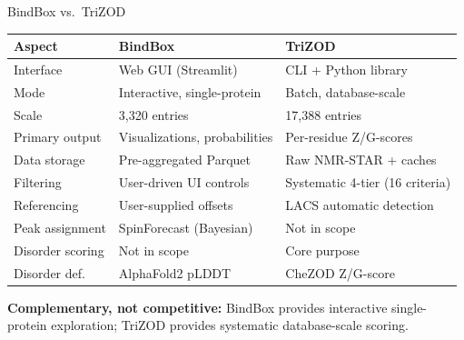 \documentclass[aspectratio=169,11pt]{beamer}
\begin{document}
\begin{frame}[shrink=5]{BindBox vs.\ TriZOD}

\begin{center}
\footnotesize
\begin{tabular}{lll}
\toprule
\textbf{Aspect} & \textbf{BindBox} & \textbf{TriZOD} \\
\midrule
Interface    & Web GUI (Streamlit)       & CLI + Python library \\
Mode         & Interactive, single-protein & Batch, database-scale \\
Scale        & 3,320 entries             & 17,388 entries \\
Primary output & Visualizations, probabilities & Per-residue Z/G-scores \\
Data storage & Pre-aggregated Parquet    & Raw NMR-STAR + caches \\
Filtering    & User-driven UI controls   & Systematic 4-tier (16 criteria) \\
Referencing  & User-supplied offsets     & LACS automatic detection \\
Peak assignment & SpinForecast (Bayesian) & Not in scope \\
Disorder scoring & Not in scope          & Core purpose \\
Disorder def.  & AlphaFold2 pLDDT        & CheZOD Z/G-score \\
\bottomrule
\end{tabular}
\end{center}

\medskip
\textbf{Complementary, not competitive:} BindBox provides interactive single-protein exploration; TriZOD provides systematic database-scale scoring.
\end{frame}
\end{document}
